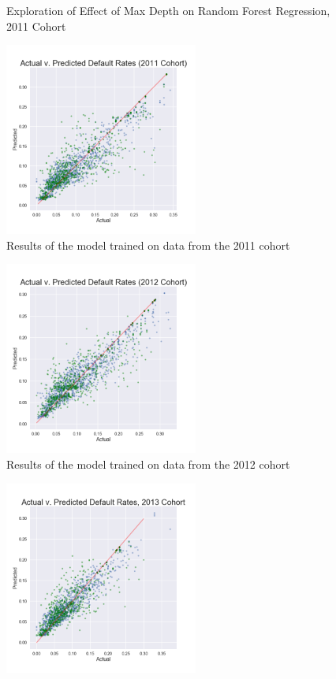 \documentclass[10pt,twocolumn]{article}
\begin{document}
\begin{enumerate}
\begin{figure}[!t]
  \caption{\Figure Exploration of Effect of Max Depth on Random Forest Regression, 2011 Cohort}
  \label{maxdepth}
\end{figure}

\begin{figure}[!t]
  \begin{center}
    \includegraphics[width=2.5in]{results2011.png}
  \end{center}

  \caption{\Figure Results of the model trained on data from the 2011 cohort}
  \label{results2011}
\end{figure}

\begin{figure}[!t]
  \begin{center}
    \includegraphics[width=2.5in]{results2012.png}
  \end{center}

  \caption{\Figure Results of the model trained on data from the 2012 cohort}
  \label{results2012}
\end{figure}

\begin{figure}[!t]
  \begin{center}
    \includegraphics[width=2.5in]{results2013.png}
  \end{center}


\end{figure}
\end{enumerate}
\end{document}
